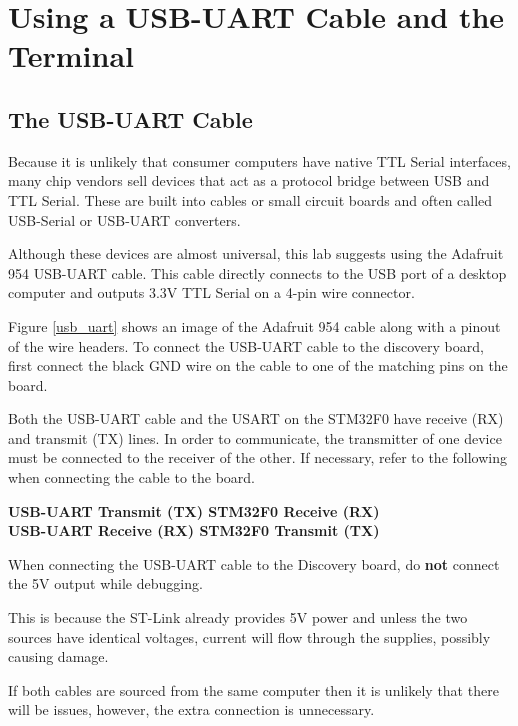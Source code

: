 \documentclass[11pt,fleqn]{book} %
\begin{document}

\section{Using a USB-UART Cable and the Terminal}
\subsection{The USB-UART Cable}
Because it is unlikely that consumer computers have native TTL Serial interfaces, many chip vendors sell devices that act as a protocol bridge between USB and TTL Serial. These are built into cables or small circuit boards and often called USB-Serial or USB-UART converters. 

Although these devices are almost universal, this lab suggests using the Adafruit 954 USB-UART cable. This cable directly connects to the USB port of a desktop computer and outputs 3.3V TTL Serial on a 4-pin wire connector. 

Figure \ref{usb_uart} shows an image of the Adafruit 954 cable along with a pinout of the wire headers. To connect the USB-UART cable to the discovery board, first connect the black GND wire on the cable to one of the matching pins on the board. 

Both the USB-UART cable and the USART on the STM32F0 have receive (RX) and transmit (TX) lines. In order to communicate, the transmitter of one device must be connected to the receiver of the other. If necessary, refer to the following when connecting the cable to the board. \\

\parbox{\textwidth} {
    \centering
    \textbf{USB-UART Transmit (TX) \textrightarrow  STM32F0 Receive (RX) \\
    USB-UART Receive (RX) \textrightarrow  STM32F0 Transmit (TX)}
}
    

\begin{warning}
    When connecting the USB-UART cable to the Discovery board, do \textbf{not} connect the 5V output while debugging. 
    
    This is because the ST-Link already provides 5V power and unless the two sources have identical voltages, current will flow through the supplies, possibly causing damage. 
    
    If both cables are sourced from the same computer then it is unlikely that there will be issues, however, the extra connection is unnecessary.
\end{warning}
\end{document}
